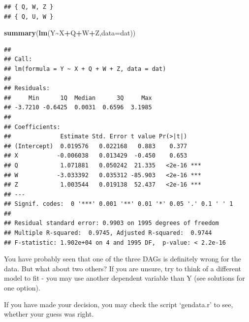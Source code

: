 \documentclass[
]{book}
\newenvironment{Shaded}{\begin{snugshade}}{\end{snugshade}}
\newcommand{\AttributeTok}[1]{\textcolor[rgb]{0.13,0.29,0.53}{#1}}
\newcommand{\FunctionTok}[1]{\textcolor[rgb]{0.13,0.29,0.53}{\textbf{#1}}}
\newcommand{\NormalTok}[1]{#1}
\newcommand{\SpecialCharTok}[1]{\textcolor[rgb]{0.81,0.36,0.00}{\textbf{#1}}}
\theoremstyle{definition}
\theoremstyle{definition}
\theoremstyle{definition}
\theoremstyle{definition}
\theoremstyle{remark}
\begin{document}
\begin{verbatim}
## { Q, W, Z }
## { Q, U, W }
\end{verbatim}

\begin{Shaded}
\begin{Highlighting}[]
\FunctionTok{summary}\NormalTok{(}\FunctionTok{lm}\NormalTok{(Y}\SpecialCharTok{\textasciitilde{}}\NormalTok{X}\SpecialCharTok{+}\NormalTok{Q}\SpecialCharTok{+}\NormalTok{W}\SpecialCharTok{+}\NormalTok{Z,}\AttributeTok{data=}\NormalTok{dat))}
\end{Highlighting}
\end{Shaded}

\begin{verbatim}
## 
## Call:
## lm(formula = Y ~ X + Q + W + Z, data = dat)
## 
## Residuals:
##     Min      1Q  Median      3Q     Max 
## -3.7210 -0.6425  0.0031  0.6596  3.1985 
## 
## Coefficients:
##              Estimate Std. Error t value Pr(>|t|)    
## (Intercept)  0.019576   0.022168   0.883    0.377    
## X           -0.006038   0.013429  -0.450    0.653    
## Q            1.071881   0.050242  21.335   <2e-16 ***
## W           -3.033392   0.035312 -85.903   <2e-16 ***
## Z            1.003544   0.019138  52.437   <2e-16 ***
## ---
## Signif. codes:  0 '***' 0.001 '**' 0.01 '*' 0.05 '.' 0.1 ' ' 1
## 
## Residual standard error: 0.9903 on 1995 degrees of freedom
## Multiple R-squared:  0.9745, Adjusted R-squared:  0.9744 
## F-statistic: 1.902e+04 on 4 and 1995 DF,  p-value: < 2.2e-16
\end{verbatim}

You have probably seen that one of the three DAGs is definitely wrong for the data. But what about two others? If you are unsure, try to think of a different model to fit - you may use another dependent variable than Y (see solutions for one option).

If you have made your decision, you may check the script `gendata.r' to see, whether your guess was right.
\end{document}
